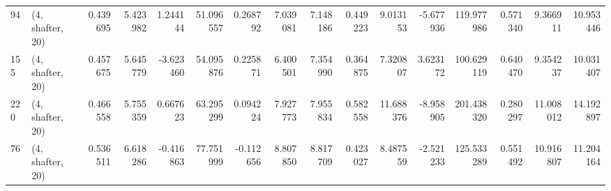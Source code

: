 \begin{tabular}{llrrrrrrrrrrrrrr}
94  &  (4, shafter, 20) &   0.439695 &   5.423982 &   1.244144 &    51.096557 &   0.268792 &   7.039081 &   7.148186 &  0.449223 &   9.013153 &  -5.677936 &   119.977986 &   0.571340 &   9.366911 &  10.953446 \\
155 &  (4, shafter, 20) &   0.457675 &   5.645779 &  -3.623460 &    54.095876 &   0.225871 &   6.400501 &   7.354990 &  0.364875 &   7.320807 &   3.623172 &   100.629119 &   0.640470 &   9.354237 &  10.031407 \\
220 &  (4, shafter, 20) &   0.466558 &   5.755359 &   0.667623 &    63.295299 &   0.094224 &   7.927773 &   7.955834 &  0.582558 &  11.688376 &  -8.958905 &   201.438320 &   0.280297 &  11.008012 &  14.192897 \\
76  &  (4, shafter, 20) &   0.536511 &   6.618286 &  -0.416863 &    77.751999 &  -0.112656 &   8.807850 &   8.817709 &  0.423027 &   8.487559 &  -2.521233 &   125.533289 &   0.551492 &  10.916807 &  11.204164 \\
\bottomrule
\end{tabular}

